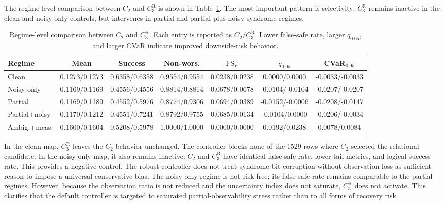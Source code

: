 \documentclass{iopjournal}
\begin{document}
The regime-level comparison between $C_2$ and $C_3^{\mathrm R}$ is shown in
Table~\ref{tab:c2-c3r-regime-metrics}. The most important pattern is selectivity:
$C_3^{\mathrm R}$ remains inactive in the clean and noisy-only controls, but
intervenes in partial and partial-plus-noisy syndrome regimes.

\begin{table}[t]
\caption{Regime-level comparison between $C_2$ and $C_3^{\mathrm R}$. Each entry
is reported as $C_2/C_3^{\mathrm R}$. Lower false-safe rate, larger $q_{0.05}$,
and larger CVaR indicate improved downside-risk behavior.}
\label{tab:c2-c3r-regime-metrics}
\centering
\tiny
\setlength{\tabcolsep}{1.5pt}
\begin{tabular}{@{}lcccccc@{}}
\toprule
Regime & Mean & Success & Non-wors. & $\mathrm{FS}_F$ &
$q_{0.05}$ & CVaR$_{0.05}$ \\
\midrule
Clean &
0.1273/0.1273 & 0.6358/0.6358 & 0.9554/0.9554 &
0.0238/0.0238 & 0.0000/0.0000 & -0.0033/-0.0033 \\
Noisy-only &
0.1169/0.1169 & 0.4556/0.4556 & 0.8814/0.8814 &
0.0678/0.0678 & -0.0104/-0.0104 & -0.0207/-0.0207 \\
Partial &
0.1169/0.1189 & 0.4552/0.5976 & 0.8774/0.9306 &
0.0694/0.0389 & -0.0152/-0.0006 & -0.0208/-0.0147 \\
Partial+noisy &
0.1170/0.1212 & 0.4551/0.7241 & 0.8792/0.9755 &
0.0685/0.0134 & -0.0104/0.0000 & -0.0206/-0.0034 \\
Ambig.+meas. &
0.1600/0.1604 & 0.5208/0.5978 & 1.0000/1.0000 &
0.0000/0.0000 & 0.0192/0.0238 & 0.0078/0.0084 \\
\bottomrule
\end{tabular}
\end{table}

In the clean map, $C_3^{\mathrm R}$ leaves the $C_2$ behavior unchanged. The
controller blocks none of the 1529 rows where $C_2$ selected the relational
candidate. In the noisy-only map, it also remains inactive: $C_2$ and
$C_3^{\mathrm R}$ have identical false-safe rate, lower-tail metrics, and logical
success rate. This provides a negative control. The robust controller does not
treat syndrome-bit corruption without observation loss as sufficient reason to
impose a universal conservative bias.
The noisy-only regime is not risk-free; its false-safe rate remains comparable to
the partial regimes. However, because the observation ratio is not reduced and the
uncertainty index does not saturate, $C_3^{\mathrm R}$ does not activate. This
clarifies that the default controller is targeted to saturated
partial-observability stress rather than to all forms of recovery risk.
\end{document}

